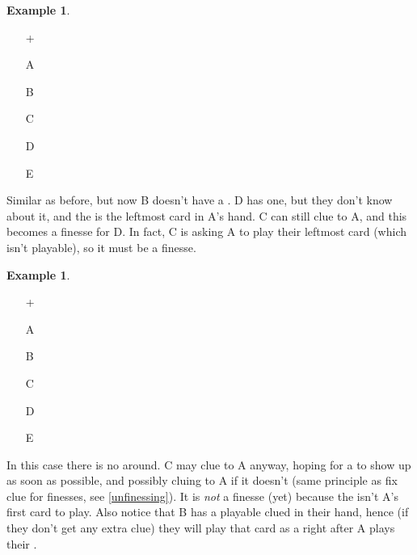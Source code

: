 \documentclass[a4paper]{article}
\theoremstyle{plain}
\theoremstyle{definition}
\newtheorem{example}[theorem]{Example}
\begin{document}
\begin{example}	\hfill \\
	\begin{minipage}{0.45\textwidth}
		\begin{itemize}
			\item[\Large +]      
			\item[\Large A]    
			\item[\Large B]    
			\item[\Large C]    
			\item[\Large D]    
			\item[\Large E]    
		\end{itemize}
	\end{minipage}%
	\begin{minipage}{0.55\textwidth}
		Similar as before, but now B doesn't have a . D has one, but they don't know about it, and the  is the leftmost card in A's hand. C can still clue  to A, and this becomes a finesse for D. In fact, C is asking A to play their leftmost card (which isn't playable), so it must be a finesse.
	\end{minipage}
\end{example} \vspace{0.15 cm}

\begin{example}	\hfill \\
	\begin{minipage}{0.45\textwidth}
		\begin{itemize}
			\item[\Large +]      
			\item[\Large A]    
			\item[\Large B]    
			\item[\Large C]    
			\item[\Large D]    
			\item[\Large E]    
		\end{itemize}
	\end{minipage}%
	\begin{minipage}{0.55\textwidth}		
		In this case there is no  around. C may clue  to A anyway, hoping for a  to show up as soon as possible, and possibly cluing  to A if it doesn't (same principle as fix clue for finesses, see \ref{unfinessing}). It is \emph{not} a finesse (yet) because the  isn't A's first card to play. Also notice that B has a playable clued  in their hand, hence (if they don't get any extra clue) they will play that card as a  right after A plays their .
	\end{minipage}
\end{example} \vspace{0.15 cm}
\end{document}
